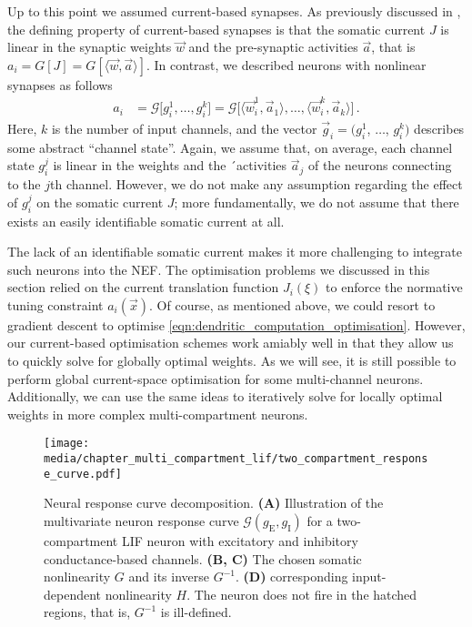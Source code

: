 Up to this point we assumed current-based synapses.
As previously discussed in , the defining property of current-based synapses is that the somatic current $J$ is linear in the synaptic weights $\vec w$ and the pre-synaptic activities $\vec a$, that is $a_i = G[J] = G[\langle \vec w, \vec a \rangle]$.
In contrast, we described neurons with nonlinear synapses as follows
\begin{align}
	a_i &=
	\mathscr{G} \bigl[
		g_i^1, \ldots, g_i^k
	\bigr] =
	\mathscr{G} \bigl[
		\langle \vec w_{i}^1, \vec a_1 \rangle,
		\ldots ,
		\langle \vec w_{i}^k, \vec a_k \rangle
	\bigr] \,.
\end{align}
Here, $k$ is the number of input channels, and the vector $\vec g_i = (g^1_i$, $\ldots$, $g^k_i)$ describes some abstract \enquote{channel state}.
Again, we assume that, on average, each channel state $g^j_i$ is linear in the weights and the ´activities $\vec a_j$ of the neurons connecting to the $j$th channel.
However, we do not make any assumption regarding the effect of $g^j_i$ on the somatic current $J$; more fundamentally, we do not assume that there exists an easily identifiable somatic current at all.

The lack of an identifiable somatic current makes it more challenging to integrate such neurons into the NEF.
The optimisation problems we discussed in this section relied on the current translation function $J_i(\xi)$ to enforce the normative tuning constraint $a_i(\vec x)$.
Of course, as mentioned above, we could resort to gradient descent to optimise \cref{eqn:dendritic_computation_optimisation}.
However, our current-based optimisation schemes work amiably well in that they allow us to quickly solve for globally optimal weights.
As we will see, it is still possible to perform global current-space optimisation for some multi-channel neurons.
Additionally, we can use the same ideas to iteratively solve for locally optimal weights in more complex multi-compartment neurons.

\begin{figure}
	\centering
	\texttt{[image: media/chapter\_multi\_compartment\_lif/two\_compartment\_response\_curve.pdf]}
	\caption[Neural response curve decomposition]{Neural response curve decomposition. \textbf{(A)} Illustration of the multivariate neuron response curve $\mathscr{G}(g_\mathrm{E}, g_\mathrm{I})$ for a two-compartment LIF neuron with excitatory and inhibitory conductance-based channels. \textbf{(B, C)} The chosen somatic nonlinearity $G$ and its inverse $G^{-1}$. \textbf{(D)} corresponding input-dependent nonlinearity $H$. The neuron does not fire in the hatched regions, that is, $G^{-1}$ is ill-defined.} 
	\label{fig:two_compartment_response_curve}
\end{figure}

